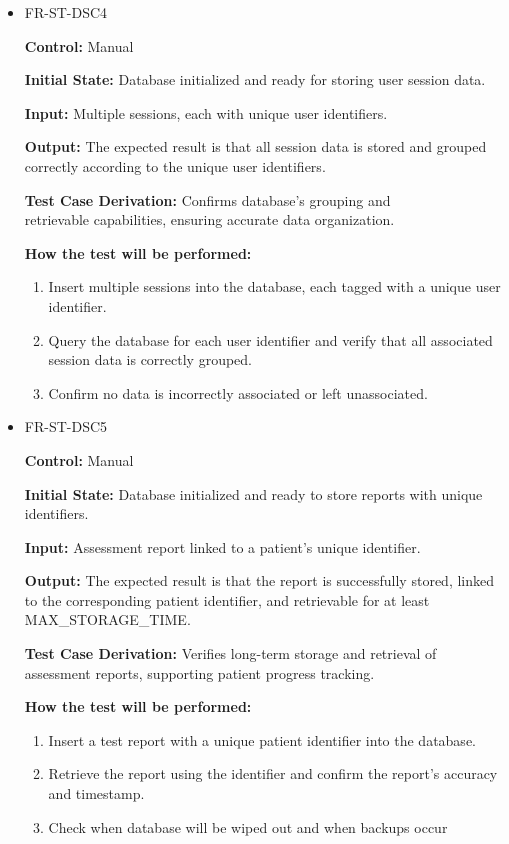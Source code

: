 \documentclass[12pt, titlepage]{article}
\begin{document}
\begin{itemize}
  \item FR-ST-DSC4
  \begin{mdframed}[linewidth=0.5mm]
      \textbf{Control:} Manual \par
      \textbf{Initial State:} Database initialized and ready for storing user session data. \par
      \textbf{Input:} Multiple sessions, each with unique user identifiers. \par
      \textbf{Output:} The expected result is that all session data is stored and grouped correctly according to the unique user identifiers. \par
      \textbf{Test Case Derivation:} Confirms database's grouping and \\retrievable capabilities, ensuring accurate data organization.\par
      \textbf{How the test will be performed:}
      \begin{enumerate}[noitemsep]
        \item Insert multiple sessions into the database, each tagged with a unique user identifier.
        \item Query the database for each user identifier and verify that all associated session data is correctly grouped.
        \item Confirm no data is incorrectly associated or left unassociated.
      \end{enumerate}
  \end{mdframed}

  \item FR-ST-DSC5
  \begin{mdframed}[linewidth=0.5mm]
      \textbf{Control:} Manual \par
      \textbf{Initial State:} Database initialized and ready to store reports with unique identifiers. \par
      \textbf{Input:} Assessment report linked to a patient’s unique identifier. \par
      \textbf{Output:} The expected result is that the report is successfully stored, linked to the corresponding patient identifier, and retrievable for at least MAX\_STORAGE\_TIME. \par
      \textbf{Test Case Derivation:} Verifies long-term storage and retrieval of assessment reports, supporting patient progress tracking. \par
      \textbf{How the test will be performed:}
      \begin{enumerate}[noitemsep]
        \item Insert a test report with a unique patient identifier into the database.
        \item Retrieve the report using the identifier and confirm the report’s accuracy and timestamp.
        \item Check when database will be wiped out and when backups occur
      \end{enumerate}
  \end{mdframed}

\end{itemize}
\end{document}
